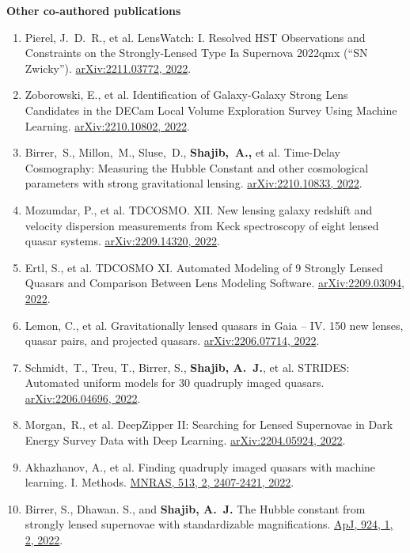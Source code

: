 \documentclass[margin, line]{res}
\begin{document}
\begin{resume}
\textbf{Other co-authored publications}
\begin{enumerate}
	\item Pierel, J.~D.~R., et al. LensWatch: I. Resolved HST Observations and Constraints on the Strongly-Lensed Type Ia Supernova 2022qmx (``SN Zwicky'').  \href{https://arxiv.org/abs/2211.03772}{arXiv:2211.03772, 2022}.
	\item Zoborowski, E., et al. Identification of Galaxy-Galaxy Strong Lens Candidates in the DECam Local Volume Exploration Survey Using Machine Learning. \href{https://arxiv.org/abs/2210.10802}{arXiv:2210.10802, 2022}.
	\item Birrer,~S., Millon,~M., Sluse,~D., \textbf{Shajib,~A.,} et al. Time-Delay Cosmography: Measuring the Hubble Constant and other cosmological parameters with strong gravitational lensing. \href{https://arxiv.org/abs/2210.10833}{arXiv:2210.10833, 2022}.
	\item Mozumdar, P., et al. TDCOSMO. XII. New lensing galaxy redshift and velocity dispersion measurements from Keck spectroscopy of eight lensed quasar systems. \href{https://arxiv.org/abs/2209.14320}{arXiv:2209.14320, 2022}.
	\item Ertl, S., et al. TDCOSMO XI. Automated Modeling of 9 Strongly Lensed Quasars and Comparison Between Lens Modeling Software. \href{https://arxiv.org/abs/2209.03094}{arXiv:2209.03094, 2022}.
	\item Lemon, C., et al. Gravitationally lensed quasars in Gaia -- IV. 150 new lenses, quasar pairs, and projected quasars. \href{https://arxiv.org/abs/2206.07714}{arXiv:2206.07714, 2022}.
	\item Schmidt,~T., Treu, T., Birrer, S., \textbf{Shajib, A.~J.}, et al. STRIDES: Automated uniform models for 30 quadruply imaged quasars. \href{https://arxiv.org/abs/2206.04696}{arXiv:2206.04696, 2022}.
	\item Morgan,~R., et al. DeepZipper II: Searching for Lensed Supernovae in Dark Energy Survey Data with Deep Learning. \href{https://arxiv.org/abs/2204.05924}{arXiv:2204.05924, 2022}.
	\item Akhazhanov, A., et al. Finding quadruply imaged quasars with machine learning. I. Methods. \href{https://ui.adsabs.harvard.edu/abs/2022MNRAS.tmp..904A/abstract}{MNRAS, 513, 2, 2407-2421, 2022}.
	\item Birrer, S., Dhawan. S., and \textbf{Shajib, A.~J.} The Hubble constant from strongly lensed supernovae with standardizable magnifications. \href{https://iopscience.iop.org/article/10.3847/1538-4357/ac323a}{ApJ, 924, 1, 2, 2022}.

\end{enumerate}
\end{resume}
\end{document}
